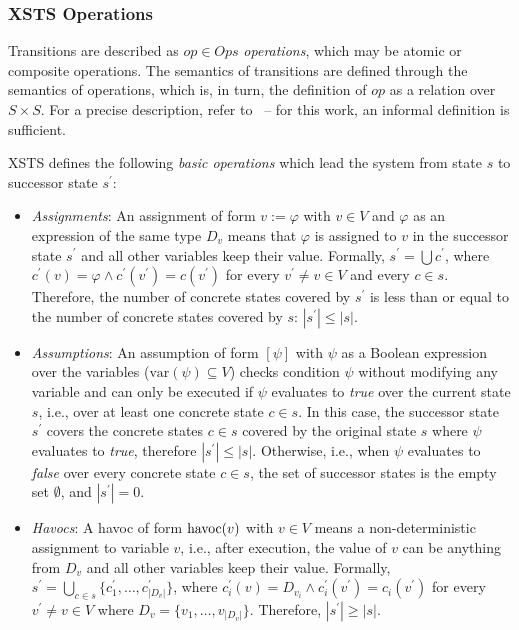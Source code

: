 \subsubsection{XSTS Operations}\label{ssec:xsts-ops}
Transitions are described as $op \in Ops$ \textit{operations}, which may be atomic or composite operations. The semantics of transitions are defined through the semantics of operations, which is, in turn, the definition of $op$ as a relation over $S \times S$. For a precise description, refer to~\cite{XSTS} -- for this work, an informal definition is sufficient.

XSTS defines the following \emph{basic operations} which lead the system from state $s$ to successor state $s^\prime$:
    \begin{itemize}
        \item \textit{Assignments}: An assignment of form $v := \varphi$ with $v \in V$ and $\varphi$ as an expression of the same type $D_v$ means that $\varphi$ is assigned to $v$ in the successor state $s^\prime$ and all other variables keep their value. Formally, $s^\prime = \bigcup c^\prime$, where $c^\prime(v) = \varphi \wedge c^\prime(v^\prime) = c(v^\prime)$ for every $v^\prime \neq v \in V$ and every $c \in s$. Therefore, the number of concrete states covered by $s^\prime$ is less than or equal to the number of concrete states covered by $s$: $|s^\prime| \leq |s|$.
        \item \textit{Assumptions}: An assumption of form $[\psi]$ with $\psi$ as a Boolean expression over the variables ($\mathrm{var}(\psi) \subseteq V$) checks condition $\psi$ without modifying any variable and can only be executed if $\psi$ evaluates to \textit{true} over the current state $s$, i.e., over at least one concrete state $c \in s$. In this case, the successor state $s^\prime$ covers the concrete states $c \in s$ covered by the original state $s$ where $\psi$ evaluates to \textit{true}, therefore $|s^\prime| \leq |s|$. Otherwise, i.e., when $\psi$ evaluates to \textit{false} over every concrete state $c \in s$, the set of successor states is the empty set $\emptyset$, and $|s^\prime| = 0$.
        \item \textit{Havocs}: A havoc of form $\mathrm{havoc}(v)$ with $v \in V$ means a non-deterministic assignment to variable $v$, i.e., after execution, the value of $v$ can be anything from $D_v$ and all other variables keep their value. Formally, $s^\prime = \bigcup_{c \in s} \{ c^\prime_1, \ldots, c^\prime_{|D_v|} \}$, where $c^\prime_i(v) = D_{v_i} \wedge c^\prime_i(v^\prime) = c_i(v^\prime)$ for every $v^\prime \neq v \in V$ where $D_v = \{ v_1, \ldots, v_{|D_v|} \}$. Therefore, $|s^\prime| \geq |s|$.

\end{itemize}
